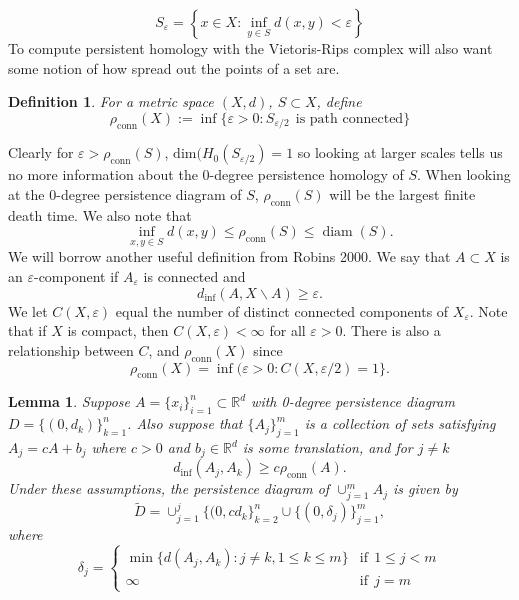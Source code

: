 \documentclass [52pt] {article}
\newcommand{\R}{\mathbb{R}}
\DeclareMathOperator{\diam}{diam}
\newtheorem{lemma}{Lemma}
\newtheorem{definition}{Definition}
\begin{document}
\[S_{\varepsilon} = \left\{x\in X: \inf_{y\in S}d(x,y)<\varepsilon\right\}\]
To compute persistent homology with the Vietoris-Rips complex will also want some notion of how spread out the points of a set are.

\begin{definition}
For a metric space $(X,d)$, $S\subset X$, define
\[\rho_{\mathrm{conn}}(X) := \inf\{\varepsilon>0:S_{\varepsilon/2} \:\:\text{is path connected}\}\]
\end{definition}

Clearly for $\varepsilon > \rho_{\mathrm{conn}}(S)$, $\text{dim}(H_0(S_{\varepsilon/2}) = 1$ so looking at larger scales tells us no more information about the 0-degree persistence homology of $S$.  When looking at the 0-degree persistence diagram of $S$, $\rho_{\mathrm{conn}}(S)$ will be the largest finite death time.  We also note that 
\[\inf_{x,y\in S} d(x,y)\le \rho_{\mathrm{conn}}(S)\le \diam(S).\]
We will borrow another useful definition from Robins 2000.  We say that $A\subset X$ is an $\varepsilon$-component if $A_\varepsilon$ is connected and 
\[d_{\inf}(A,X\backslash A) \ge\varepsilon.\]
We let $C(X,\varepsilon)$ equal the number of distinct connected components of $X_\varepsilon$.  Note that if $X$ is compact, then $C(X,\varepsilon)<\infty$ for all $\varepsilon>0$.  There is also a relationship between $C$, and $\rho_{\mathrm{conn}}(X)$ since 
\[\rho_{\mathrm{conn}}(X) = \inf(\varepsilon >0 : C(X,\varepsilon/2) = 1\}.\]

\begin{lemma}\label{lemma : self_similar_persistence}
Suppose $A = \{x_i\}_{i=1}^n\subset\R^d$ with 0-degree persistence diagram $D = \{(0,d_k)\}_{k=1}^n$.  Also suppose that $\{A_j\}_{j=1}^m$ is a collection of sets satisfying $A_j = cA + b_j$ where $c >0$ and $b_j\in\R^d$ is some translation, and for $j\not=k$
\[d_{\inf}(A_j,A_k)\ge c\rho_{\mathrm{conn}}(A).\]
Under these assumptions, the persistence diagram of $\cup_{j=1}^mA_j$ is given by
\[\tilde{D} = \cup_{j=1}^j\{(0,cd_k\}_{k=2}^n \cup\{(0,\delta_j)\}_{j=1}^m,\]
where 
\[\delta_j = 
\begin{cases}
\min\{ d(A_j,A_k):j\not = k, 1\le k\le m\}  &\mathrm{if}\:\: 1\le j<m\\
\infty   &\mathrm{if}\:\: j=m
\end{cases}\]

\end{lemma}
\end{document}
